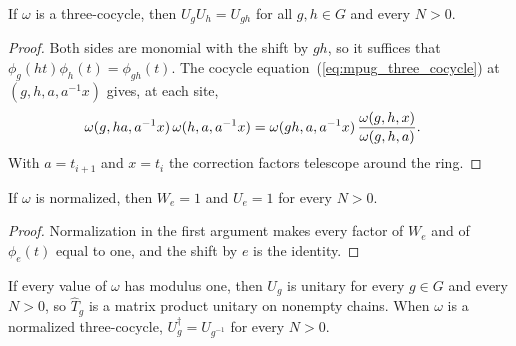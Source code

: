 \begin{lemma}
    \label{thm:asymex_group_cocycle_mul}
    \leanok
    If $\omega$ is a three-cocycle, then $U_gU_h=U_{gh}$ for all
    $g,h\in G$ and every $N>0$.
\end{lemma}

\begin{proof}
    \leanok
    Both sides are monomial with the shift by $gh$, so it suffices that
    $\phi_g(ht)\phi_h(t)=\phi_{gh}(t)$. The cocycle
    equation~(\ref{eq:mpug_three_cocycle}) at $(g,h,a,a^{-1}x)$ gives, at
    each site,
    \begin{align}
        \omega(g,ha,a^{-1}x)\,\omega(h,a,a^{-1}x)
         & =\omega(gh,a,a^{-1}x)\,
        \frac{\omega(g,h,x)}{\omega(g,h,a)}.
        \notag
    \end{align}
    With $a=t_{i+1}$ and $x=t_i$ the correction factors telescope around
    the ring.
\end{proof}

\begin{lemma}
    \label{thm:asymex_group_cocycle_one}
    \leanok
    If $\omega$ is normalized, then $W_e=1$ and $U_e=1$ for every $N>0$.
\end{lemma}

\begin{proof}
    \leanok
    Normalization in the first argument makes every factor of $W_e$ and of
    $\phi_e(t)$ equal to one, and the shift by $e$ is the identity.
\end{proof}

\begin{lemma}
    \label{thm:asymex_group_cocycle_unitary}
    \leanok
    If every value of $\omega$ has modulus one, then $U_g$ is unitary for
    every $g\in G$ and every $N>0$, so $\hat T_g$ is a matrix product
    unitary on nonempty chains. When $\omega$ is a normalized
    three-cocycle, $U_g^\dagger=U_{g^{-1}}$ for every $N>0$.
\end{lemma}

